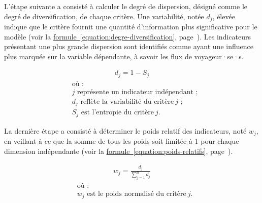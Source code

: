 \begin{refsegment}
L'étape suivante a consisté à calculer le degré de dispersion, désigné comme le degré de diversification, de chaque critère. Une variabilité, notée \(d_j\), élevée indique que le critère fournit une quantité d'information plus significative pour le modèle (voir la \hyperref[equation:degre-diversification]{formule~\ref{equation:degre-diversification}}, page~\pageref{equation:degre-diversification}). Les indicateurs présentant une plus grande dispersion sont identifiés comme ayant une influence plus marquée sur la variable dépendante, à savoir les flux de voyageur·se·s.%

\begin{equation}
\label{equation:degre-diversification}
\begin{aligned}
d_j = 1 - S_j
\end{aligned}
\end{equation}
\begin{align*}
    &\text{où~:} \\
    &j \text{ représente un indicateur indépendant~;}\\
    &d_j \text{ reflète la variabilité du critère}~j\text{~;}\\
    &S_j \text{ est l'entropie du critère}~j\text{.}
\end{align*}%

La dernière étape a consisté à déterminer le poids relatif des indicateurs, noté \(w_j\), en veillant à ce que la somme de tous les poids soit limitée à 1 pour chaque dimension indépendante (voir la \hyperref[equation:poids-relatifs]{formule~\ref{equation:poids-relatifs}}, page~\pageref{equation:poids-relatifs}).%

\begin{equation}
\label{equation:poids-relatifs}
\begin{aligned}
w_j = \frac{d_j}{\sum\limits_{j=1}^{n} d_j}
\end{aligned}
\end{equation}
\begin{align*}
    &\text{où~:} \\
    &w_j \text{ est le poids normalisé du critère}~j\text{.}\\
\end{align*}%


\end{refsegment}
